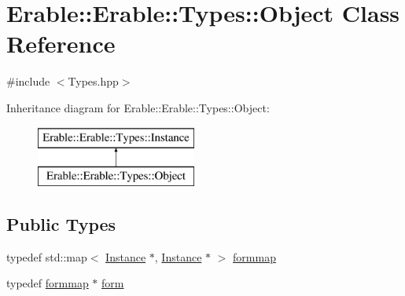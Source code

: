 \hypertarget{class_erable_1_1_erable_1_1_types_1_1_object}{}\section{Erable\+::Erable\+::Types\+::Object Class Reference}
\label{class_erable_1_1_erable_1_1_types_1_1_object}


{\ttfamily \#include $<$Types.\+hpp$>$}

Inheritance diagram for Erable\+::Erable\+::Types\+::Object\+:\begin{figure}[H]
\begin{center}
\leavevmode
\includegraphics[height=2.000000cm]{class_erable_1_1_erable_1_1_types_1_1_object}
\end{center}
\end{figure}
\subsection*{Public Types}
\begin{DoxyCompactItemize}
\item 
typedef std\+::map$<$ \mbox{\hyperlink{class_erable_1_1_erable_1_1_types_1_1_instance}{Instance}} $\ast$, \mbox{\hyperlink{class_erable_1_1_erable_1_1_types_1_1_instance}{Instance}} $\ast$ $>$ \mbox{\hyperlink{class_erable_1_1_erable_1_1_types_1_1_object_a02986c32b60bd5ce3d6393d637b8e040}{formmap}}
\item 
typedef \mbox{\hyperlink{class_erable_1_1_erable_1_1_types_1_1_object_a02986c32b60bd5ce3d6393d637b8e040}{formmap}} $\ast$ \mbox{\hyperlink{class_erable_1_1_erable_1_1_types_1_1_object_ad26eec63322773e4ed4ea6fc56dfa073}{form}}
\end{DoxyCompactItemize}

